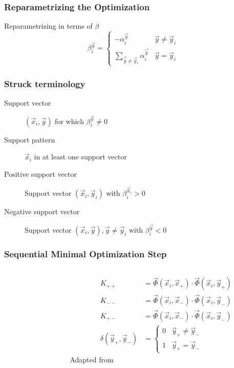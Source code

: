 \begin{frame}
    \frametitle{Reparametrizing the Optimization}
    Reparametrizing in terms of \(\beta\) \cite{Bordes:2007:SMS:1273496.1273508}
    \[ \beta_i^\vec{y} = \begin{cases}
        -\alpha_i^\vec{y} & \vec{y} \ne \vec{y}_i \\
        \sum_{\vec{\bar{y}} \ne \vec{y}_i} \alpha_i^\vec{\bar{y}} & \vec{y} = \vec{y}_i
    \end{cases} \]
    \struckDualBeta
\end{frame}

\begin{frame}
    \frametitle{Struck terminology}
    \begin{description}
        \item [Support vector] \( \left( \vec{x}_i, \vec{y} \right) \) for which \(\beta_i^\vec{y}
            \ne 0 \)
        \item [Support pattern] \(\vec{x}_i\) in at least one support vector
        \item [Positive support vector] Support vector \( \left( \vec{x}_i, \vec{y}_i \right) \)
            with \( \beta_i^{\vec{y}_i} > 0 \)
        \item [Negative support vector] Support vector \( \left( \vec{x}_i, \vec{y} \right), \vec{y}
            \ne \vec{y}_i \) with \( \beta_i^\vec{y} < 0 \)
    \end{description}
\end{frame}

\begin{frame}
    \frametitle{Sequential Minimal Optimization Step}
    \begin{columns}[T]
        \begin{column}{0.5\textwidth}
            \struckSmo
        \end{column}
        \begin{column}{0.5\textwidth}
            \begin{align*}
                K_{++} &= \vec{\Phi} (\vec{x}_i, \vec{x}_+) \cdot \vec{\Phi} (\vec{x}_i, \vec{y}_+) \\
                K_{--} &= \vec{\Phi} (\vec{x}_i, \vec{x}_-) \cdot \vec{\Phi} (\vec{x}_i, \vec{y}_-) \\
                K_{+-} &= \vec{\Phi} (\vec{x}_i, \vec{x}_-) \cdot \vec{\Phi} (\vec{x}_i, \vec{y}_-) \\
                \delta(\vec{y}_+, \vec{y}_-) &= \begin{cases}
                    0 & \vec{y}_+ \ne \vec{y}_- \\
                    1 & \vec{y}_+ = \vec{y}_-
                \end{cases}
            \end{align*}
            Adapted from \cite{sequential-minimal-optimization-a-fast-algorithm-for-training-support-vector-machines}
        \end{column}
    \end{columns}
\end{frame}

